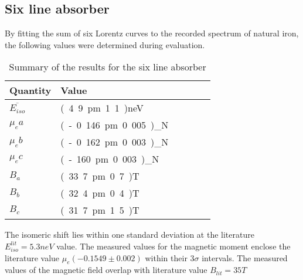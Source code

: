 \subsection{Six line absorber}
By fitting the sum of six Lorentz curves to the recorded spectrum of natural iron, the following values were determined during evaluation.
\begin{table}[H]\centering
	\begin{tabular}{@{}llllll@{}}
		\toprule
		 Quantity& Value \\
		\midrule
		$\overline{E_{iso}}$ & \unit{(4.9\pm1.1)}{neV}\\
		$\mu_ea$ & \unit{(-0.146\pm0.005)}{\mu_N} \\
		$\mu_eb$ & \unit{(-0.162\pm0.003)}{\mu_N}\\
		$\mu_ec$ & \unit{(-160\pm0.003)}{\mu_N}\\
		$B_a$ & \unit{(33.7\pm0.7)}{T}  \\
		$B_b$ & \unit{(32.4\pm0.4)}{T}  \\
		$B_c$ & \unit{(31.7\pm1.5)}{T}  \\ 
		\bottomrule
	\end{tabular}
	\caption[Summary six line absorber]{Summary of the results for the six line absorber}
	\label{tb:summary:sixline abs}
\end{table}
The isomeric shift lies within one standard deviation at the literature $E^{lit}_{iso}=\unit{5.3}{neV}$ value. The measured values for the magnetic moment enclose the literature  value $\mu_e (-0.1549\pm0.002)$\cite{stone} within their 3$\sigma$ intervals. The measured values of the magnetic field overlap with literature value $B_{lit}=\unit{35}{T}$


